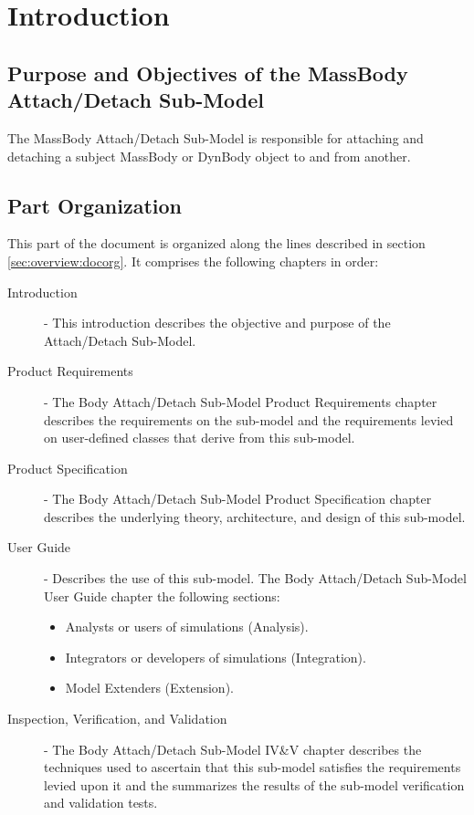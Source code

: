 %
\chapter{Introduction}\label{ch:BodyAttach_Detach:intro}

\section{Purpose and Objectives of the
MassBody Attach/Detach Sub-Model}

The MassBody Attach/Detach Sub-Model
is responsible for attaching and detaching
a subject MassBody or DynBody object to and from another.

\section{Part Organization}
This part of the \ModelDesc document is organized along the
lines described in section \ref{sec:overview:docorg}. It
comprises the following chapters in order:

\begin{description}
\item[Introduction] -
This introduction describes the objective and purpose of the
Attach/Detach Sub-Model.

\item[Product Requirements] -
The Body Attach/Detach Sub-Model Product Requirements chapter
describes the requirements on the sub-model
and the requirements levied on user-defined classes that derive from
this sub-model.

\item[Product Specification] -
The Body Attach/Detach Sub-Model Product Specification chapter
describes the underlying theory, architecture, and design of
this sub-model.

\item[User Guide] -
Describes the use of this sub-model.
The Body Attach/Detach Sub-Model User Guide chapter
the following sections:
\begin{itemize}
 \item Analysts or users of simulations (Analysis).
 \item Integrators or developers of simulations (Integration).
 \item Model Extenders (Extension).
\end{itemize}

\item[Inspection, Verification, and Validation] -
The Body Attach/Detach Sub-Model IV\&V chapter
describes the techniques used to ascertain that
this sub-model satisfies the requirements levied upon it
and the summarizes the results of
the sub-model verification and validation tests.
\end{description}
